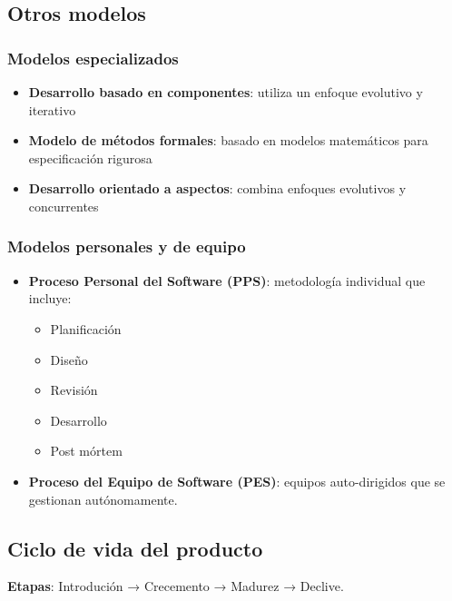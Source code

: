 \documentclass[a4paper,11pt]{report}
\begin{document}
    \subsection{Otros modelos}\label{subsec:otros-modelos}

    \subsubsection{Modelos especializados}

    \begin{itemize}
        \item \textbf{Desarrollo basado en componentes}: utiliza un enfoque evolutivo y iterativo
        \item \textbf{Modelo de métodos formales}: basado en modelos matemáticos para especificación rigurosa
        \item \textbf{Desarrollo orientado a aspectos}: combina enfoques evolutivos y concurrentes
    \end{itemize}

    \subsubsection{Modelos personales y de equipo}

    \begin{itemize}
        \item \textbf{Proceso Personal del Software (PPS)}: metodología individual que incluye:
        \begin{itemize}
            \item Planificación
            \item Diseño
            \item Revisión
            \item Desarrollo
            \item Post mórtem
        \end{itemize}
        \item \textbf{Proceso del Equipo de Software (PES)}: equipos auto-dirigidos que se gestionan autónomamente.
    \end{itemize}


    \subsection{Ciclo de vida del producto}\label{subsec:ciclo-de-vida-del-producto}

    \textbf{Etapas}: Introdución → Crecemento → Madurez → Declive.
\end{document}
